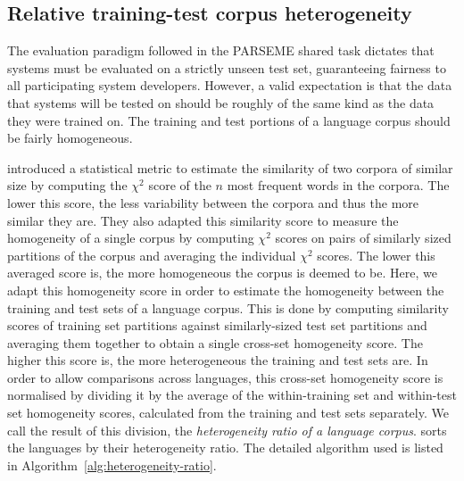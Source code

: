 \documentclass[output=paper,modfonts,nonflat,draftmode]{langsci/langscibook}
\begin{document}
\subsection{Relative training-test corpus heterogeneity}

The evaluation paradigm followed in the PARSEME shared task dictates that systems must be evaluated on a strictly unseen test set, guaranteeing fairness to all participating system developers. However, a valid expectation is that the data that systems will be tested on should be roughly of the same kind as the data they were trained on. The training and test portions of a language corpus should be fairly homogeneous.

\citet{Kilgarriff1998} introduced a statistical metric to estimate the similarity of two corpora of similar size by computing the $\chi^{2}$ score of the $n$ most frequent words in the corpora. The lower this score, the less variability between the corpora and thus the more similar they are. They also adapted this similarity score to measure the homogeneity of a single corpus by computing $\chi^{2}$ scores on pairs of similarly sized partitions of the corpus and averaging the individual $\chi^{2}$ scores. The lower this averaged score is, the more homogeneous the corpus is deemed to be. Here, we adapt this homogeneity score in order to estimate the homogeneity between the training and test sets of a language corpus. This is done by computing similarity scores of training set partitions against similarly-sized test set partitions and averaging them together to obtain a single cross-set homogeneity score. The higher this score is, the more heterogeneous the training and test sets are. In order to allow comparisons across languages, this cross-set homogeneity score is normalised by dividing it by the average of the within-training set and within-test set homogeneity scores, calculated from the training and test sets separately. We call the result of this division, the \emph{heterogeneity ratio of a language corpus}.  sorts the languages by their heterogeneity ratio. The detailed algorithm used is listed in Algorithm~\ref{alg:heterogeneity-ratio}.
\end{document}

